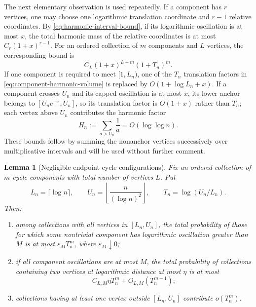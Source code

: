 \documentclass[11pt]{article}
\newtheorem{lemma}[theorem]{Lemma}
\theoremstyle{remark}
\begin{document}
The next elementary observation is used repeatedly.  If a component has
$r$ vertices, one may choose one logarithmic translation coordinate and
$r-1$ relative coordinates.  By \eqref{eq:harmonic-interval-bound}, if its
logarithmic oscillation is at most $x$, the total harmonic mass of the relative
coordinates is at most $C_r(1+x)^{r-1}$.  For an ordered collection of $m$
components and $L$ vertices, the corresponding bound is
\[
        C_L(1+x)^{L-m}(1+T_n)^m.
\tag{10.52}\label{eq:component-harmonic-volume}
\]
If one component is required to meet $[1,L_n)$, one of the $T_n$ translation
factors in \eqref{eq:component-harmonic-volume} is replaced by
$O(1+\log L_n+x)$.  If a component crosses $U_n$ and its capped oscillation is
at most $x$, its lower anchor belongs to $[U_ne^{-x},U_n]$, so its translation
factor is $O(1+x)$ rather than $T_n$; each vertex above $U_n$ contributes the
harmonic factor
\[
        H_n:=\sum_{a>U_n}\frac1a=O(\log\log n).
\tag{10.53}\label{eq:upper-harmonic-mass}
\]
These bounds follow by summing the nonanchor vertices successively over
multiplicative intervals and will be used without further comment.

\begin{lemma}[Negligible endpoint cycle configurations]
\label{lem:negligible-endpoint-cycle-configurations}
Fix an ordered collection of $m$ cycle components with total number of vertices
$L$.  Put
\[
        L_n=\lceil\log n\rceil,
        \qquad
        U_n=\left\lfloor\frac{n}{(\log n)^2}\right\rfloor,
        \qquad
        T_n=\log(U_n/L_n).
\]
Then:
\begin{enumerate}[label=(\roman*)]
\item among collections with all vertices in $[L_n,U_n]$, the total probability
of those for which some nontrivial component has logarithmic oscillation greater
than $M$ is at most $\varepsilon_M T_n^m$, where
$\varepsilon_M\downarrow0$;
\item if all component oscillations are at most $M$, the total probability of
collections containing two vertices at logarithmic distance at most $\eta$ is
at most
\[
        C_{L,M}\eta T_n^m+O_{L,M}(T_n^{m-1});
\tag{10.54}\label{eq:close-cycle-configurations}
\]
\item collections having at least one vertex outside $[L_n,U_n]$ contribute
$o(T_n^m)$.
\end{enumerate}
\end{lemma}
\end{document}
